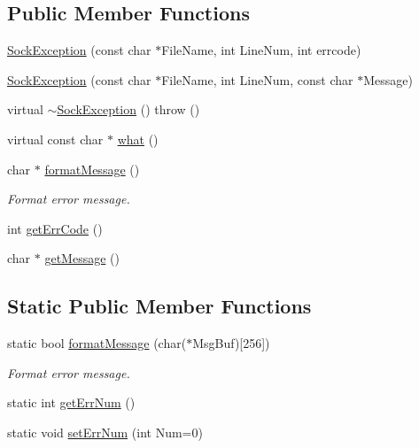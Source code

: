\subsection*{Public Member Functions}
\begin{DoxyCompactItemize}
\item 
\hyperlink{classSockException_a8ba3515f80c0b12b52dadbabf3778eef}{Sock\+Exception} (const char $\ast$File\+Name, int Line\+Num, int errcode)
\item 
\hyperlink{classSockException_ab0fa9e79b1f81f053821b399aebb8ccf}{Sock\+Exception} (const char $\ast$File\+Name, int Line\+Num, const char $\ast$Message)
\item 
virtual \hyperlink{classSockException_a29e9e5ac1de9ab65891c2310d764c60f}{$\sim$\+Sock\+Exception} ()  throw ()
\item 
virtual const char $\ast$ \hyperlink{classSockException_afb2986f2ddefe08ae1e735796cd05b1a}{what} ()
\item 
char $\ast$ \hyperlink{classSockException_a8c1eccb58e83020078f12f3050b7ac4f}{format\+Message} ()
\begin{DoxyCompactList}\small\item\em Format error message. \end{DoxyCompactList}\item 
int \hyperlink{classSockException_ab4dc853a2d0e855675327c54c0bd7301}{get\+Err\+Code} ()
\item 
char $\ast$ \hyperlink{classSockException_a198639b7111afd33d453e8bca22a7784}{get\+Message} ()
\end{DoxyCompactItemize}
\subsection*{Static Public Member Functions}
\begin{DoxyCompactItemize}
\item 
static bool \hyperlink{classSockException_ab830154d70e966c979585a1d285dd990}{format\+Message} (char($\ast$Msg\+Buf)\mbox{[}256\mbox{]})
\begin{DoxyCompactList}\small\item\em Format error message. \end{DoxyCompactList}\item 
static int \hyperlink{classSockException_a2539deadacaa23d71da34028d3f2ebc6}{get\+Err\+Num} ()
\item 
static void \hyperlink{classSockException_aa11513eff91eeed1cc5d098951700823}{set\+Err\+Num} (int Num=0)
\end{DoxyCompactItemize}

